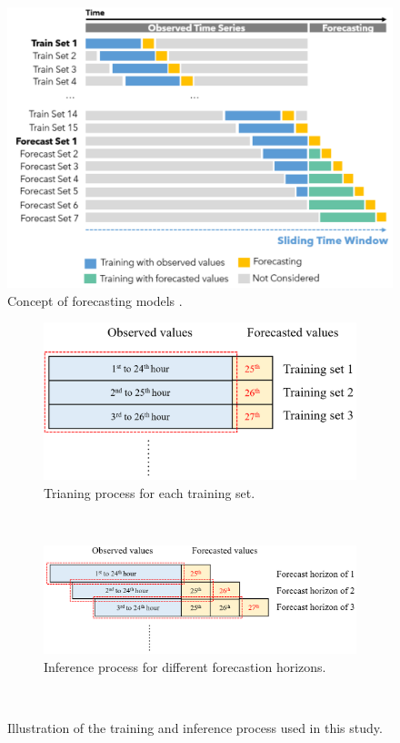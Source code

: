 \begin{figure}[!ht]
  \centering
  \includegraphics[width=0.9\columnwidth]{imgs/forecast-concept.png}
  \caption{Concept of forecasting models \citep{liuTimeSeriesForecasting2020}.}
  \label{fig:forecast-concept}
\end{figure}

\begin{figure}[!ht]
  \centering
  \begin{subfigure}[t]{0.65\textwidth}
    \includegraphics[width=\linewidth]{imgs/revision/train-forecast-horizon.png}
    \caption{Trianing process for each training set.} \label{fig:train-process}
  \end{subfigure}\\
  \vspace{1em}
  \begin{subfigure}[t]{0.9\textwidth}
    \includegraphics[width=\linewidth]{imgs/revision/inference-forecast-horizon.png}
    \caption{Inference process for different forecastion horizons.} \label{fig:inference-process}
  \end{subfigure}\\
\caption{Illustration of the training and inference process used in this study.} \label{fig:forecast-horizon}
\end{figure}

